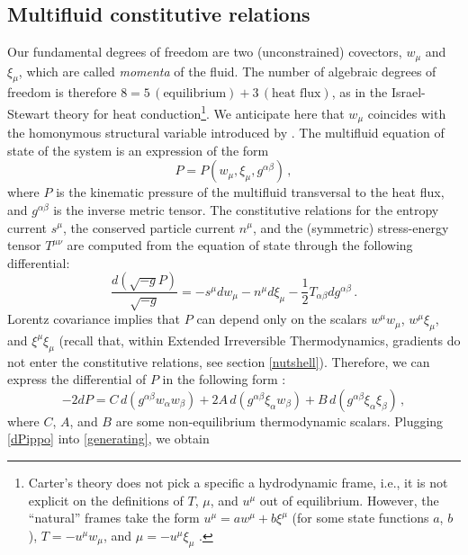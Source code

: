 \documentclass[a4paper, amsfonts, amssymb, amsmath, reprint, showkeys, nofootinbib, twoside, onecolumn, notitlepage]{revtex4-1}
\begin{document}
\subsection{Multifluid constitutive relations}

Our fundamental degrees of freedom are two (unconstrained) covectors, $w_\mu$ and $\xi_\mu$, which are called \textit{momenta} of the fluid. The number of algebraic degrees of freedom is therefore $8=5 \, (\text{equilibrium})+3\, (\text{heat flux})$, as in the Israel-Stewart theory for heat conduction\footnote{Carter's theory does not pick a specific a hydrodynamic frame, i.e., it is not explicit on the definitions of $T$, $\mu$, and $u^\mu$ out of equilibrium. However, the ``natural'' frames take the form $u^\mu =a w^\mu +b \xi^\mu$ (for some state functions $a$, $b$), $T=-u^\mu w_\mu$, and $\mu=-u^\mu \xi_\mu$ \cite{Carter_starting_point,Lopez09,Termo}.}. We anticipate here that $w_\mu$ coincides with the homonymous structural variable introduced by \citet{OttingerSoloHeat1998}. The multifluid equation of state of the system is an expression of the form
\begin{equation}
P=P(w_\mu,\xi_\mu,g^{\alpha \beta}) \, ,
\end{equation}
where $P$ is the kinematic pressure of the multifluid transversal to the heat flux, and $g^{\alpha \beta}$ is the inverse metric tensor. The constitutive relations for the entropy current $s^\mu$, the conserved particle current $n^\mu$, and the (symmetric) stress-energy tensor $T^{\mu \nu}$ are computed from the equation of state through the following differential:
\begin{equation}\label{generating}
\dfrac{d(\sqrt{-g}P)}{\sqrt{-g}} = -s^\mu dw_\mu -n^\mu d\xi_\mu -\dfrac{1}{2} T_{\alpha \beta} dg^{\alpha \beta} \, .
\end{equation}
Lorentz covariance implies that $P$ can depend only on the scalars $w^\mu w_\mu$, $w^\mu \xi_\mu$, and $\xi^\mu \xi_\mu$ (recall that, within Extended Irreversible Thermodynamics, gradients do not enter the constitutive relations, see section \ref{nutshell}). Therefore, we can express the differential of $P$ in the following form \cite{Prix_single_vortex}:
\begin{equation}\label{dPippo}
-2dP =C \, d(g^{\alpha \beta}w_\alpha w_\beta) +2A \,  d(g^{\alpha \beta}\xi_\alpha w_\beta) + B \, d(g^{\alpha \beta}\xi_\alpha \xi_\beta) \, ,   
\end{equation}
where $C$, $A$, and $B$ are some non-equilibrium thermodynamic scalars. Plugging \eqref{dPippo} into \eqref{generating}, we obtain
\end{document}
